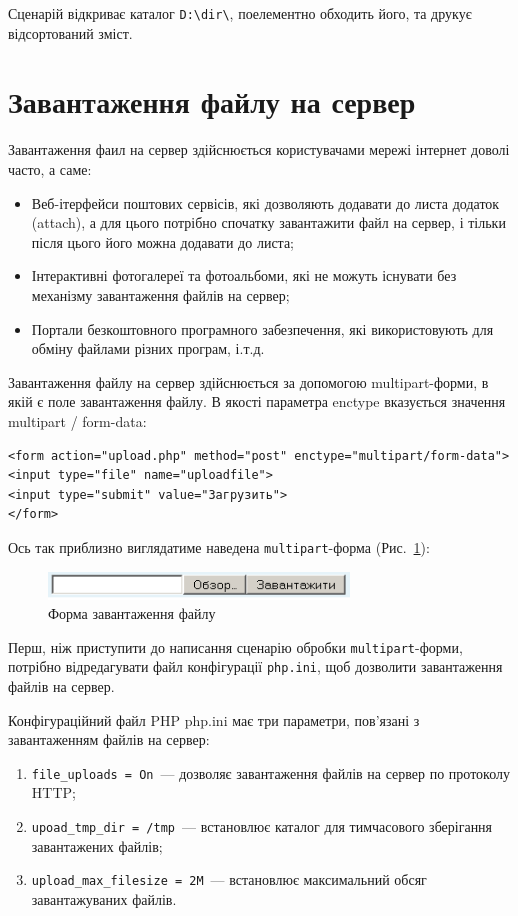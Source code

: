 Сценарій відкриває каталог \verb'D:\dir\', поелементно обходить його, та друкує відсортований зміст.

\section{Завантаження файлу на сервер}
Завантаження фаил на сервер здійснюється користувачами мережі інтернет доволі часто, а саме:
\begin{itemize}
\item Веб-ітерфейси поштових сервісів, які дозволяють додавати до листа додаток (attach), а для цього потрібно спочатку завантажити файл на сервер, і тільки після цього його можна додавати до листа;
\item Інтерактивні фотогалереї та фотоальбоми, які не можуть існувати без механізму завантаження файлів на сервер;
\item Портали безкоштовного програмного забезпечення, які використовують для обміну файлами різних програм, і.т.д. 
\end{itemize}


Завантаження файлу на сервер здійснюється за допомогою multipart-форми, в якій є поле завантаження файлу. В якості параметра enctype вказується значення multipart / form-data:
\begin{verbatim}
<form action="upload.php" method="post" enctype="multipart/form-data">
<input type="file" name="uploadfile">
<input type="submit" value="Загрузить">
</form>
\end{verbatim}

Ось так приблизно виглядатиме наведена \verb'multipart'-форма (Рис.~\ref{f5-1:image}):

\begin{figure}
\includegraphics[scale=1,width=8cm]{ch05-01.png}
\caption{Форма завантаження файлу}
\label{f5-1:image}
\end{figure}

Перш, ніж приступити до написання сценарію обробки \verb'multipart'-форми, потрібно відредагувати файл конфігурації \verb'php.ini', щоб дозволити завантаження файлів на сервер.

Конфігураційний файл PHP php.ini має три параметри, пов'язані з завантаженням файлів на сервер:
\begin{enumerate}
\item \verb'file_uploads = On'~--- дозволяє завантаження файлів на сервер по протоколу HTTP;
\item \verb'upoad_tmp_dir = /tmp'~--- встановлює каталог для тимчасового зберігання завантажених файлів;
\item \verb'upload_max_filesize = 2M'~--- встановлює максимальний обсяг завантажуваних файлів. 

\end{enumerate}

